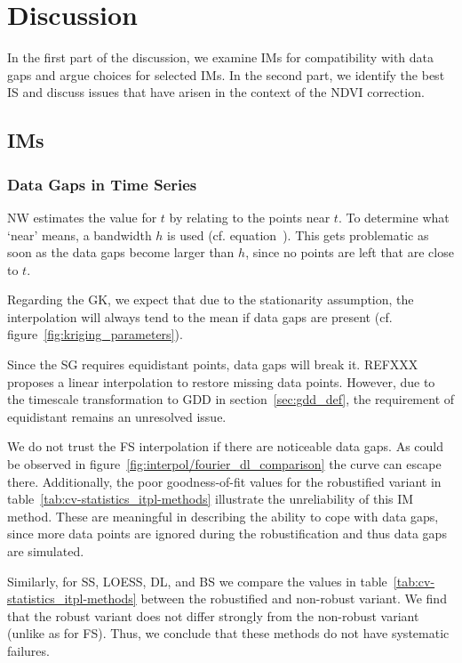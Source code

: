 \chapter{Discussion}\label{sec:discussion}
    In the first part of the discussion, we examine IMs for compatibility with data gaps and argue choices for selected IMs. In the second part, we identify the best IS and discuss issues that have arisen in the context of the NDVI correction.


\section{{{IM}}s}{ \label{sec:discussion_itpl}
    \subsection{Data Gaps in Time Series}\label{sec:discussion_itpl_data_gaps}{
        NW estimates the value for $t$ by relating to the points near $t$. To determine what `near' means, a bandwidth $h$ is used (cf. equation~). This gets problematic as soon as the data gaps become larger than $h$, since no points are left that are close to $t$. 

        Regarding the GK, we expect that due to the stationarity assumption, the interpolation will always tend to the mean if data gaps are present (cf. figure~\ref{fig:kriging_parameters}). 

        Since the SG requires equidistant points, data gaps will break it. REFXXX proposes a linear interpolation to restore missing data points. However, due to the timescale transformation to GDD in section~\ref{sec:gdd_def}, the requirement of equidistant remains an unresolved issue.

        We do not trust the FS interpolation if there are noticeable data gaps. As could be observed in figure~\ref{fig:interpol/fourier_dl_comparison} the curve can escape there. Additionally, the poor goodness-of-fit values for the robustified variant in table~\ref{tab:cv-statistics_itpl-methods} illustrate the unreliability of this IM method.
        These are meaningful in describing the ability to cope with data gaps, since more data points are ignored during the robustification and thus data gaps are simulated. 

        Similarly, for SS, LOESS, DL, and BS we compare the values in table~\ref{tab:cv-statistics_itpl-methods} between the robustified and non-robust variant. We find that the robust variant does not differ strongly from the non-robust variant (unlike as for FS). Thus, we conclude that these methods do not have systematic failures.

}}
